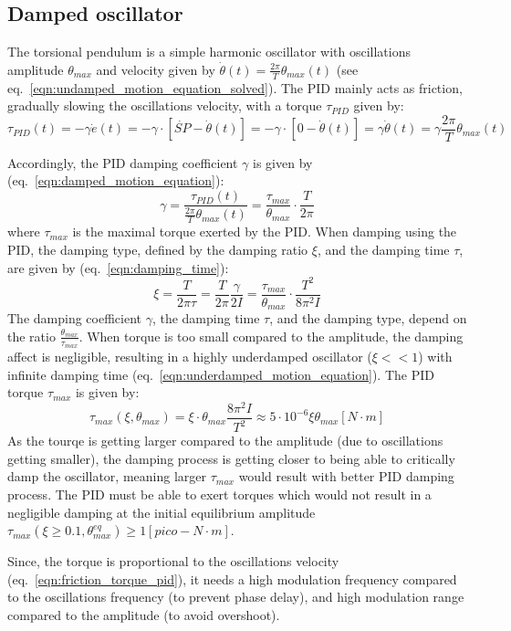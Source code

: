 \documentclass[\main/master.tex]{subfiles}
\begin{document}
\subsection{Damped oscillator}
The torsional pendulum is a simple harmonic oscillator with oscillations amplitude $\theta_{max}$ and velocity given by $\dot{\theta}(t) =\frac{2\pi}{T} \theta_{max}( t)$ (see eq.~\ref{eqn:undamped_motion_equation_solved}). The PID mainly acts as friction, gradually slowing the oscillations velocity, with a torque $\tau_{PID}$ given by:
\begin{equation}
\tau_{PID}(t) = -\gamma\dot{e}(t) =  -\gamma\cdot [\dot{SP} -\dot{\theta}(t)] =-\gamma\cdot [0-\dot{\theta}(t)]  =  \gamma\dot{\theta}(t) =  \gamma\frac{2\pi}{T} \theta_{max}( t) 
\label{eqn:friction_torque_pid}
\end{equation}
\par\noindent
Accordingly, the PID damping coefficient $\gamma$ is given by (eq.~\ref{eqn:damped_motion_equation}):
\begin{equation}
\gamma  =  \frac{\tau_{PID}(t)}{\frac{2\pi}{T} \theta_{max}( t) } =\frac{\tau_{max}}{\theta_{max}}\cdot \frac{ T}{2\pi}          \label{eqn:pid damping coefficient}
\end{equation}
where $\tau_{max}$ is the maximal torque exerted by the PID. When damping using the PID, the damping type, defined by the damping ratio $\xi$, and the damping time $\tau$, are given by (eq.~\ref{eqn:damping_time}):
\begin{equation}
\xi = \frac{T}{2 \pi \tau } =  \frac{T}{2 \pi  }\frac{\gamma}{2I}  = \frac{ \tau_{max}}{\theta_{max}} \cdot \frac{T^2}{8\pi^2 I}  \label{eqn:damping_time_pid}
\end{equation}
The damping coefficient $\gamma$, the damping time $\tau$, and the damping type, depend on the ratio $\frac{\theta_{max}}{\tau_{max}}$. When torque is too small compared to the amplitude, the damping affect is negligible, resulting in a highly underdamped oscillator ($\xi << 1$) with infinite damping time (eq.~\ref{eqn:underdamped_motion_equation}). The PID torque $\tau_{max} $ is given by:
\begin{equation}
\tau_{max} (\xi ,\theta_{max})=\xi\cdot\theta_{max}\frac{ 8 \pi^2 I }{T^2} \approx  5\cdot 10^{-6} \xi\theta_{max}[N\cdot m]
\label{eqn:damping_torque_pid}
\end{equation}
As the tourqe is getting larger compared to the amplitude (due to oscillations getting smaller), the damping process is getting closer to being able to critically damp the oscillator, meaning larger $\tau_{max}$ would result with better PID damping process. The PID must be able to exert torques which would not result in a negligible damping at the initial equilibrium amplitude $\tau_{max} (\xi\geq 0.1 ,\theta_{max}^{eq})\geq 1[pico-N\cdot m] $. 
\par\noindent
Since, the torque is proportional to the oscillations velocity (eq.~\ref{eqn:friction_torque_pid}), it needs a high modulation frequency compared to the oscillations frequency (to prevent phase delay), and high modulation range compared to the amplitude (to avoid overshoot). 
\end{document}
